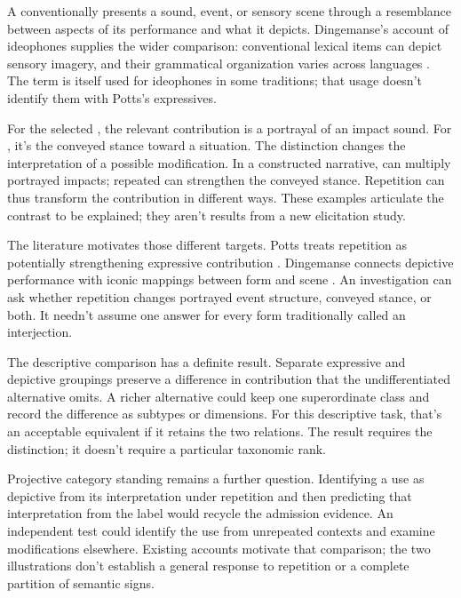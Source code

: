 \documentclass[12pt]{article}
\begin{document}
A  conventionally presents a sound, event, or sensory
scene through a resemblance between aspects of its performance and what
it depicts. Dingemanse's account of ideophones supplies the wider comparison:
conventional lexical items can depict sensory imagery, and their grammatical
organization varies across languages \citep[2--3]{dingemanse2018}.
The term  is itself used for ideophones in some traditions;
that usage doesn't identify them with Potts's expressives.

For the selected , the relevant contribution is a portrayal
of an impact sound. For , it's the conveyed stance toward
a situation. The distinction changes the interpretation of a possible
modification. In a constructed narrative,  can
multiply portrayed impacts; repeated  can strengthen the
conveyed stance. Repetition can thus transform the contribution in
different ways. These examples articulate the contrast to be explained;
they aren't results from a new elicitation study.

The literature motivates those different targets. Potts treats repetition
as potentially strengthening expressive contribution \citep[181--182]{potts2007}.
Dingemanse connects depictive performance with iconic mappings between
form and scene \citep[10--11]{dingemanse2018}. An investigation can
ask whether repetition changes portrayed event structure, conveyed stance,
or both. It needn't assume one answer for every form traditionally
called an interjection.

The descriptive comparison has a definite result. Separate expressive
and depictive groupings preserve a difference in contribution that the
undifferentiated alternative omits. A richer alternative could keep one
superordinate class and record the difference as subtypes or dimensions.
For this descriptive task, that's an acceptable equivalent if it retains
the two relations. The result requires the distinction; it doesn't require
a particular taxonomic rank.

Projective category standing remains a further question. Identifying a use
as depictive from its interpretation under repetition and then predicting
that interpretation from the label would recycle the admission evidence.
An independent test could identify the use from unrepeated contexts and
examine modifications elsewhere. Existing accounts motivate that comparison;
the two illustrations don't establish a general response to repetition or
a complete partition of semantic signs.
\end{document}
